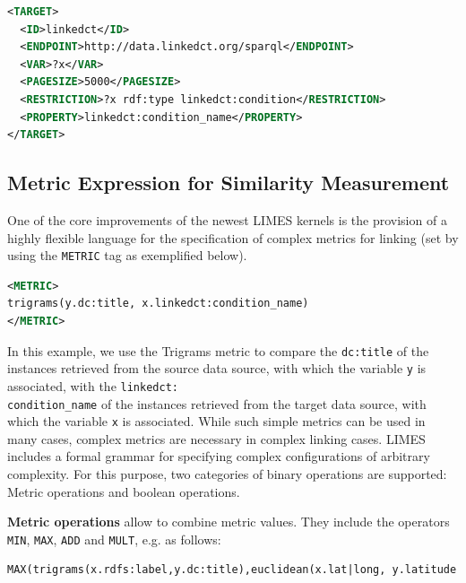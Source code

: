 \documentclass[a4paper, 11pt]{article}
\begin{document}
\begin{ttfamily}
\begin{lstlisting}[language=XML,basicstyle=\scriptsize,numberstyle=\tiny]
<TARGET>
  <ID>linkedct</ID>
  <ENDPOINT>http://data.linkedct.org/sparql</ENDPOINT>
  <VAR>?x</VAR>
  <PAGESIZE>5000</PAGESIZE>
  <RESTRICTION>?x rdf:type linkedct:condition</RESTRICTION>
  <PROPERTY>linkedct:condition_name</PROPERTY>
</TARGET>
\end{lstlisting}
\end{ttfamily}

\subsection{Metric Expression for Similarity Measurement}
One of the core improvements of the newest LIMES kernels is the provision of a highly flexible language for the specification of complex metrics for linking (set by using the \texttt{METRIC} tag as exemplified below).

\begin{ttfamily}
\begin{lstlisting}[language=XML,basicstyle=\scriptsize,numberstyle=\tiny]
<METRIC>
trigrams(y.dc:title, x.linkedct:condition_name)
</METRIC>
\end{lstlisting}
\end{ttfamily}

In this example, we use the Trigrams metric to compare the \texttt{dc:title} of the instances retrieved from the source data source, with which the variable \texttt{y} is associated, with the \texttt{linkedct:}\\\texttt{condition\_name} of the instances retrieved from the target data source, with which the variable \texttt{x} is associated. While such simple metrics can be used in many cases, complex metrics are necessary in complex linking cases. LIMES includes a formal grammar for specifying complex configurations of arbitrary complexity. For this purpose, two categories of binary operations are supported: Metric operations and boolean operations.

\textbf{Metric operations} allow to combine metric values. They include the operators \texttt{MIN}, \texttt{MAX}, \texttt{ADD} and \texttt{MULT}, e.g. as follows:

\begin{ttfamily}
\begin{lstlisting}[language=XML,basicstyle=\scriptsize,numberstyle=\tiny]
MAX(trigrams(x.rdfs:label,y.dc:title),euclidean(x.lat|long, y.latitude|longitude)).
\end{lstlisting}
\end{ttfamily}
\end{document}
